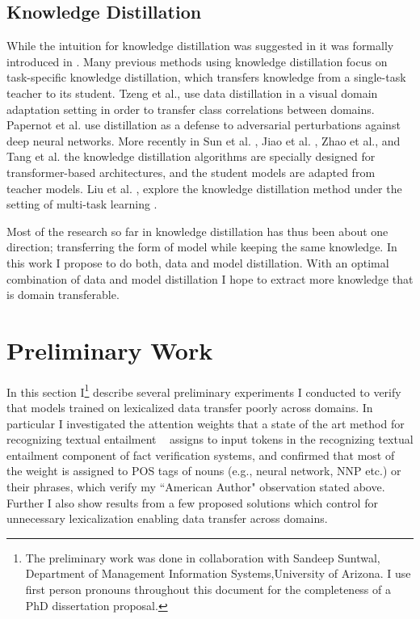 \documentclass{article}
\begin{document}
\subsection{Knowledge Distillation}
While the intuition for knowledge distillation was suggested in \citep*{ba2014deep} it was formally introduced in \citep*{hinton2015distilling}. Many previous methods using knowledge distillation focus on task-specific knowledge distillation, which transfers knowledge from a single-task teacher to its student. Tzeng et al.\citep*{tzeng2015simultaneous}, use data distillation in a visual domain adaptation setting in order to transfer class correlations between domains. Papernot et al. \citep*{papernot2016distillation} use distillation as a defense to adversarial perturbations against deep neural networks. More recently in Sun et al. \citep*{sun2019patient} , Jiao et al. \citep*{jiao2019tinybert},  Zhao et al.\citep*{zhao2019extreme}, and Tang et al. \citep*{tang2019distilling} the knowledge distillation algorithms are specially designed for transformer-based architectures, and the student models are adapted from teacher models. Liu et al. \citep*{liu2019attentive}, explore the knowledge distillation method under the setting of multi-task learning \citep*{caruana1997multitask} \citep*{baxter2000model}.

Most of the research so far in knowledge distillation has thus been about one direction; transferring the form of model while keeping the same knowledge. In this work I propose to do both, data and model distillation. With an optimal combination of data and model distillation I hope to extract more knowledge that is domain transferable.


\section{Preliminary Work}


In this section I\footnote{The preliminary work was done in collaboration with Sandeep Suntwal,  Department of Management Information Systems,University of Arizona. I use first person pronouns throughout this document for the completeness of a PhD dissertation proposal.} describe several preliminary experiments I conducted to verify that models trained on lexicalized data transfer poorly across domains. In particular I investigated the attention weights that a state of the art method for recognizing textual entailment ~\citep*{parikh2016decomposable} assigns to input tokens in the recognizing textual entailment component of fact verification systems, and confirmed that most of the weight is assigned to POS tags of nouns (e.g., neural network, NNP etc.) or their phrases, which verify my ``American Author" observation stated above. Further I also show results from a few proposed solutions which control for unnecessary lexicalization enabling data transfer across domains.
\end{document}
